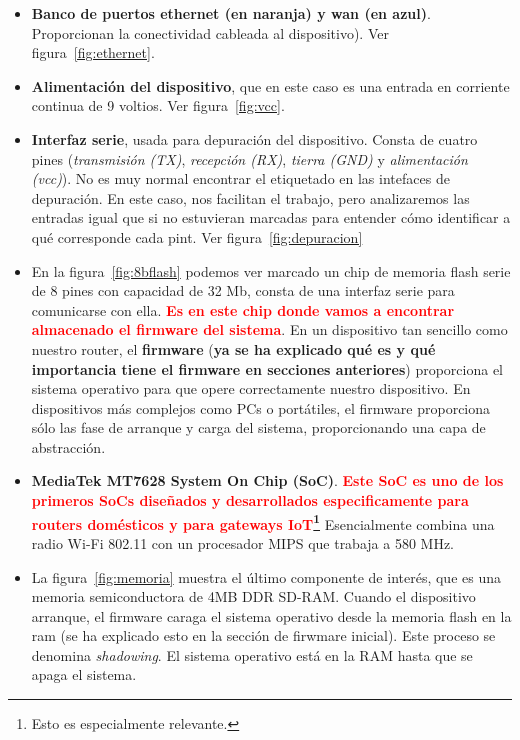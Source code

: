\documentclass[12pt,a4paper, brazil]{article}
\begin{document}
\begin{itemize}
    \item \textbf{Banco de puertos ethernet (en naranja) y wan (en azul)}. Proporcionan la conectividad cableada al dispositivo). Ver figura~\ref{fig:ethernet}.
    \item \textbf{Alimentación del dispositivo}, que en este caso es una entrada en corriente continua de 9 voltios. Ver figura~\ref{fig:vcc}.
    \item \textbf{Interfaz serie}, usada para depuración del dispositivo. Consta de cuatro pines (\emph{transmisión (TX)}, \emph{recepción (RX)}, \emph{tierra (GND)} y \emph{alimentación (vcc)}). No es muy normal encontrar el etiquetado en las intefaces de depuración. En este caso, nos facilitan el trabajo, pero analizaremos las entradas igual que si no estuvieran marcadas para entender cómo identificar a qué corresponde cada pint. Ver figura~\ref{fig:depuracion}
    \item En la figura~\ref{fig:8bflash} podemos ver marcado un chip de memoria flash serie de 8 pines con capacidad de 32 Mb, consta de una interfaz serie para comunicarse con ella. \textbf{\textcolor{red}{Es en este chip donde vamos a encontrar almacenado el firmware del sistema}}. En un dispositivo tan sencillo como nuestro router, el \textbf{firmware} (\textbf{\textcolor{azul}{ya se ha explicado qué es y qué importancia tiene el firmware en secciones anteriores}}) proporciona el sistema operativo para que opere correctamente nuestro dispositivo. En dispositivos más complejos como PCs o portátiles, el firmware proporciona sólo las fase de arranque y carga del sistema, proporcionando una capa de abstracción.  
    \item \textbf{MediaTek MT7628 System On Chip (SoC)}. \textbf{\textcolor{red}{Este SoC es uno de los primeros SoCs diseñados y desarrollados especificamente para routers domésticos y para gateways IoT\footnote{Esto es especialmente relevante.}}} Esencialmente combina una radio Wi-Fi 802.11 con un procesador MIPS que trabaja a 580 MHz. 
    \item La figura~\ref{fig:memoria} muestra el último componente de interés, que es una memoria semiconductora de 4MB DDR SD-RAM.  Cuando el dispositivo arranque, el firmware caraga el sistema operativo desde la memoria flash en la ram (se ha explicado esto en la sección de firwmare inicial). Este proceso se denomina \emph{shadowing}. El sistema operativo está en la RAM hasta que se apaga el sistema. 
\end{itemize}
\end{document}
